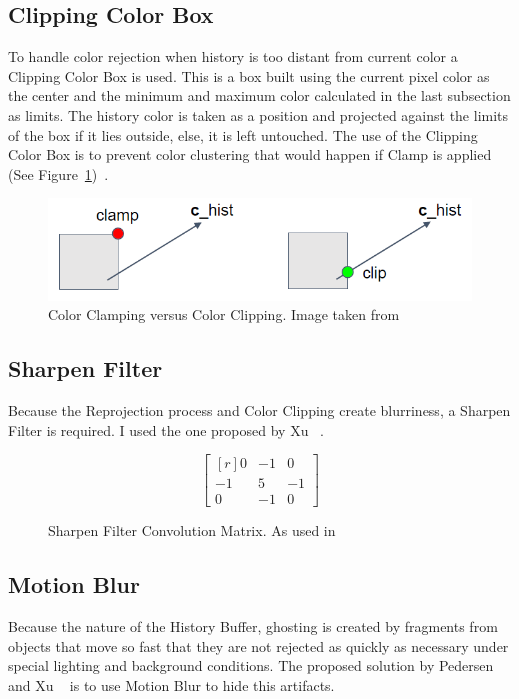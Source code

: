 \documentclass{acmsiggraph}               %
\begin{document}
\subsection{Clipping Color Box}
To handle color rejection when history is too distant from current color a Clipping Color Box is used. This is a box built using the current pixel color as the center and the minimum and maximum color calculated in the last subsection as limits. The history color is taken as a position and projected against the limits of the box if it lies outside, else, it is left untouched. The use of the Clipping Color Box is to prevent color clustering that would happen if Clamp is applied (See Figure~\ref{fig_Constraint})~\cite{Fuglsand2016}.

\begin{figure}[H]
    \centering
    \includegraphics[width=0.9\columnwidth]{Constraint.png}
    \caption{Color Clamping versus Color Clipping. Image taken from \protect\cite{Fuglsand2016}}
    \label{fig_Constraint}
\end{figure}

\subsection{Sharpen Filter}
Because the Reprojection process and Color Clipping create blurriness, a Sharpen Filter is required. I used the one proposed by Xu ~\cite{XU2016}.
\begin{figure}[H]
	\centering
    \[
    \begin{bmatrix*}[r]
      0 & -1 &  0 \\
      -1 &  5 & -1 \\
      0 & -1 &  0
    \end{bmatrix*}
    \]
    \caption{Sharpen Filter Convolution Matrix. As used in \protect\cite{XU2016}}
	\label{fig_Sharpen}
\end{figure}

\subsection{Motion Blur}
Because the nature of the History Buffer, ghosting is created by fragments from objects that move so fast that they are not rejected as quickly as necessary under special lighting and background conditions. The proposed solution by Pedersen and Xu ~\cite{Fuglsand2016,XU2016} is to use Motion Blur to hide this artifacts.
\end{document}
